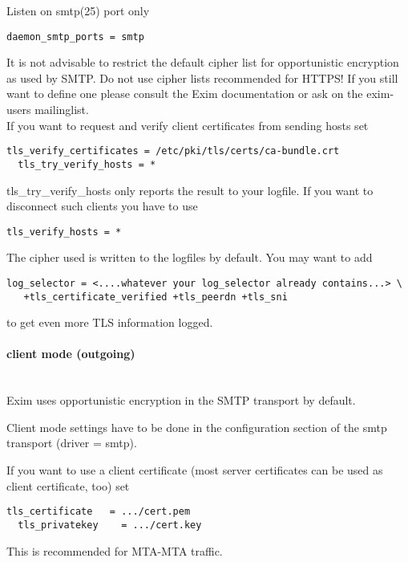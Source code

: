 Listen on smtp(25) port only
\begin{lstlisting}[breaklines]
  daemon_smtp_ports = smtp
\end{lstlisting}

It is not advisable to restrict the default cipher list for opportunistic encryption as used by SMTP. Do not use cipher lists recommended for HTTPS! If you still want to define one please consult the Exim documentation or ask on the exim-users mailinglist.\\

If you want to request and verify client certificates from sending hosts set
\begin{lstlisting}[breaklines]
  tls_verify_certificates = /etc/pki/tls/certs/ca-bundle.crt
  tls_try_verify_hosts = *
\end{lstlisting}

tls\_try\_verify\_hosts only reports the result to your logfile. If you want to disconnect such clients you have to use
\begin{lstlisting}[breaklines]
  tls_verify_hosts = *
\end{lstlisting}

The cipher used is written to the logfiles by default. You may want to add
\begin{lstlisting}[breaklines]
  log_selector = <....whatever your log_selector already contains...> \
   +tls_certificate_verified +tls_peerdn +tls_sni
\end{lstlisting}
to get even more TLS information logged.

\paragraph*{client mode (outgoing)}\mbox{}\\

Exim uses opportunistic encryption in the SMTP transport by default.

Client mode settings have to be done in the configuration section of the smtp transport (driver = smtp).

If you want to use a client certificate (most server certificates can be used as client certificate, too) set
\begin{lstlisting}[breaklines]
  tls_certificate   = .../cert.pem
  tls_privatekey    = .../cert.key
\end{lstlisting}
This is recommended for MTA-MTA traffic.\\

